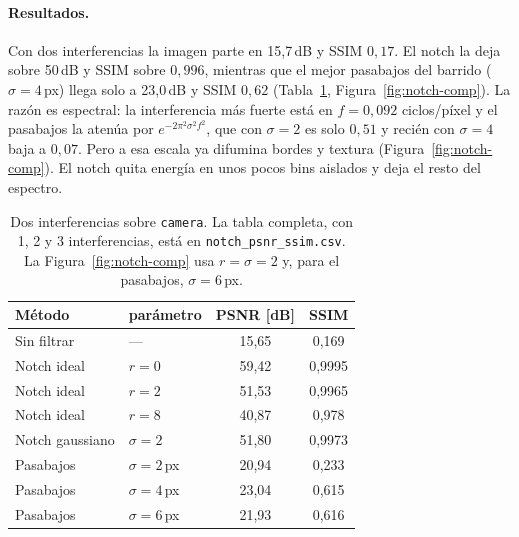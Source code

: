 
\paragraph{Resultados.}
Con dos interferencias la imagen parte en 15{,}7\,dB y SSIM $0{,}17$. El notch la deja sobre
50\,dB y SSIM sobre $0{,}996$, mientras que el mejor pasabajos del barrido ($\sigma=4$\,px) llega solo a 23{,}0\,dB
y SSIM $0{,}62$ (Tabla~\ref{tab:notch}, Figura~\ref{fig:notch-comp}). La razón es espectral: la
interferencia más fuerte está en $f=0{,}092$ ciclos/píxel y el pasabajos la atenúa por
$e^{-2\pi^2\sigma^2f^2}$, que con $\sigma=2$ es solo $0{,}51$ y recién con $\sigma=4$ baja a
$0{,}07$. Pero a esa escala ya difumina bordes y textura (Figura~\ref{fig:notch-comp}). El notch quita energía en unos pocos bins aislados y deja el resto del espectro.

\begin{table}[htbp]
  \centering
  \small
  \begin{tabular}{llcc}
    \toprule
    Método & parámetro & PSNR [dB] & SSIM \\
    \midrule
    Sin filtrar      & ---            & 15{,}65 & 0{,}169 \\
    Notch ideal      & $r=0$          & 59{,}42 & 0{,}9995 \\
    Notch ideal      & $r=2$          & 51{,}53 & 0{,}9965 \\
    Notch ideal      & $r=8$          & 40{,}87 & 0{,}978  \\
    Notch gaussiano  & $\sigma=2$     & 51{,}80 & 0{,}9973 \\
    Pasabajos        & $\sigma=2$\,px & 20{,}94 & 0{,}233  \\
    Pasabajos        & $\sigma=4$\,px & 23{,}04 & 0{,}615  \\
    Pasabajos        & $\sigma=6$\,px & 21{,}93 & 0{,}616  \\
    \bottomrule
  \end{tabular}
  \caption{Dos interferencias sobre \texttt{camera}. La tabla completa, con 1, 2 y 3
    interferencias, está en \texttt{notch\_psnr\_ssim.csv}. La Figura~\ref{fig:notch-comp} usa $r=\sigma=2$ y, para el pasabajos, $\sigma=6$\,px.}
  \label{tab:notch}
\end{table}


